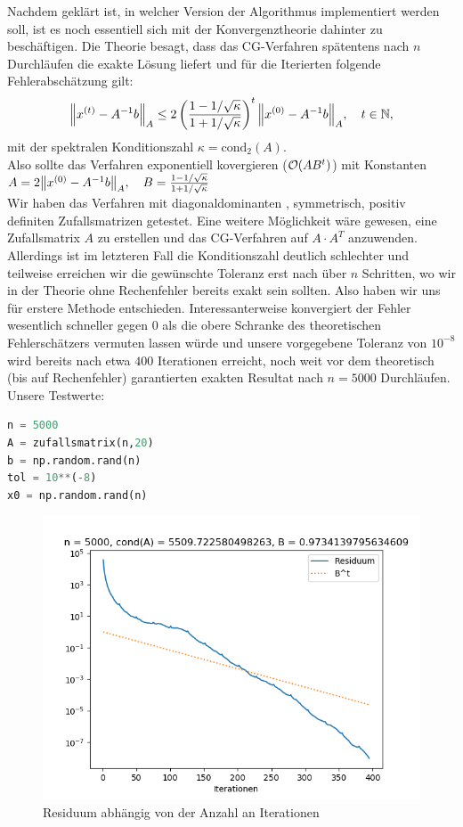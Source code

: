 Nachdem geklärt ist, in welcher Version der Algorithmus implementiert werden soll, ist es noch essentiell sich mit der
Konvergenztheorie dahinter zu beschäftigen.
Die Theorie besagt, dass das CG-Verfahren spätentens nach $n$ Durchläufen die exakte Lösung liefert und für die Iterierten
folgende Fehlerabschätzung gilt:
\begin{align*}
  {\left \| x^{(t)}-A^{-1}b \right \|}_A \leq 2\left(\frac{1-1/\sqrt{\kappa}}{1+1/\sqrt{\kappa}}\right)^t{\left \| x^{(0)}-A^{-1}b \right \|}_A, \quad t \in \mathbb{N},
\end{align*}
mit der spektralen Konditionszahl $\kappa = \text{cond}_2(A)$. \\
Also sollte das Verfahren exponentiell kovergieren ($\mathcal{O} {\left ( AB^t \right )}$) mit Konstanten\\
$A = 2{\left \| x^{(0)}-A^{-1}b \right \|}_A, \quad B = \frac{1-1/\sqrt{\kappa}}{1+1/\sqrt{\kappa}}$\\
Wir haben das Verfahren mit diagonaldominanten , symmetrisch, positiv definiten Zufallsmatrizen getestet. Eine weitere
Möglichkeit wäre gewesen, eine Zufallsmatrix $A$ zu erstellen und das CG-Verfahren auf $A\cdot A^T$ anzuwenden. Allerdings ist
im letzteren Fall die Konditionszahl deutlich schlechter und teilweise erreichen wir die gewünschte Toleranz erst nach über $n$
Schritten, wo wir in der Theorie ohne Rechenfehler bereits exakt sein sollten. Also haben wir uns für erstere Methode entschieden.
Interessanterweise konvergiert der Fehler wesentlich schneller gegen 0 als die obere Schranke des theoretischen Fehlerschätzers
vermuten lassen würde und unsere vorgegebene Toleranz von $10^{-8}$ wird bereits
nach etwa $400$ Iterationen erreicht, noch weit vor dem theoretisch
(bis auf Rechenfehler) garantierten exakten Resultat nach $n = 5000$ Durchläufen.
Unsere Testwerte: \\

\begin{lstlisting}[language=Python]
n = 5000
A = zufallsmatrix(n,20)
b = np.random.rand(n)
tol = 10**(-8)
x0 = np.random.rand(n)
\end{lstlisting}

\begin{figure}
    \centering
    \includegraphics[width=\linewidth]{Aufgabe_1/c2.png}
    \caption{Residuum abhängig von der Anzahl an Iterationen}
    \label{fig:my_label}
\end{figure}
\FloatBarrier
